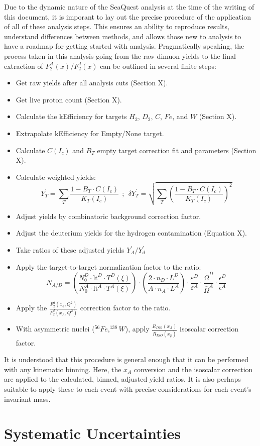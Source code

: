 Due to the dynamic nature of the SeaQuest analysis at the time of the writing of this document, it is imporant to lay out the precise procedure of the application of all of these analysis steps. This ensures an ability to reproduce results, understand differences between methods, and allows those new to analysis to have a roadmap for getting started with analysis. Pragmatically speaking, the process taken in this analysis going from the raw dimuon yields to the final extraction of $F_2^A(x)/F_2^d(x)$ can be outlined in several finite steps:
\begin{itemize}
	\item Get raw yields after all analysis cuts (Section X).
	\item Get live proton count (Section X).
	\item Calculate the kEfficiency for targets $H_2$, $D_2$, $C$, $Fe$, and $W$ (Section X).
	\item Extrapolate kEfficiency for Empty/None target.
	\item Calculate $C(I_c)$ and $B_T$ empty target correction fit and parameters (Section X).
	\item Calculate weighted yields:
	\begin{equation}
	Y_T^\prime = \sum\limits_T \frac{1 - B_T \cdot C(I_c)}{K_T(I_c)} \ \ ; \ \ \delta Y_T^\prime = \sqrt{\sum\limits_T \left(\frac{1 - B_T \cdot C(I_c)}{K_T(I_c)}\right)^2}
	\end{equation}
	\item {} Adjust yields by combinatoric background correction factor.
	\item Adjust the deuterium yields for the hydrogen contamination (Equation X).
	\item Take ratios of these adjusted yields $Y_A^\prime/Y_d^\prime$
	\item Apply the target-to-target normalization factor to the ratio:
	\begin{equation}
	N_{A/D} =
	\left(\frac{ N_0^D \cdot \text{lt}^D \cdot T^D(\xi)}{N_0^A \cdot \text{lt}^A \cdot T^A(\xi) } \right) \cdot 
	\left( \frac{ 2 \cdot n_D \cdot L^D }{ A \cdot n_A \cdot L^A } \right) \cdot 
	\frac{ \varepsilon^D }{ \varepsilon^A }  \cdot 
	\frac{ \bar{\Omega}^D }{\bar{ \Omega}^A } \cdot 
	\frac{ \epsilon^D }{ \epsilon^A }
	\end{equation}
	\item Apply the $\frac{F_2^d(x_d, Q^2)}{F_2^d(x_A, Q^2)}$ correction factor to the ratio.
	\item With asymmetric nuclei ($^{56}Fe, ^{138}W$), apply $\frac{R_{ISO}(x_A) }{R_{ISO}(x_p)}$ isoscalar correction factor.
\end{itemize}
It is understood that this procedure is general enough that it can be performed with any kinematic binning. Here, the $x_A$ conversion and the isoscalar correction are applied to the calculated, binned, adjusted yield ratios. It is also perhaps suitable to apply these to each event with precise considerations for each event's invariant mass.


\section{Systematic Uncertainties}
